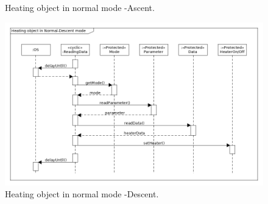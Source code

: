 \begin{landscape}
\begin{figure}[H]
    \caption{Heating object in normal mode -Ascent.}
    \label{heaterb}
\end{figure}
\begin{figure}[H]
    \centering
    \includegraphics[height=0.9\textwidth]{appendix/img/heater-seq-dia-c.png}
    \caption{Heating object in normal mode -Descent.}
    \label{heaterc}
\end{figure}

\end{landscape}
